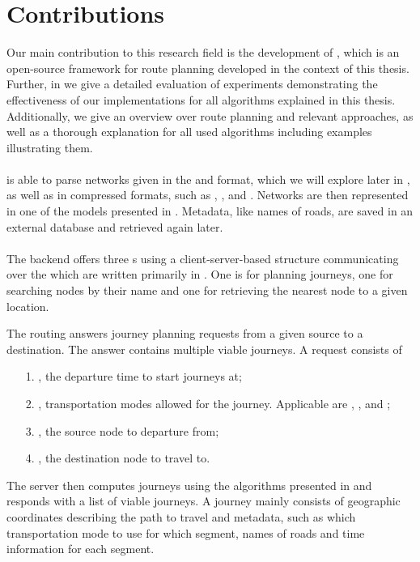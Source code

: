 \section{Contributions}
	Our main contribution to this research field is the development of \cobweb {}, which is an open-source
	framework for \multiModal route planning developed in the context of this thesis. Further, in 
	we give a detailed evaluation of experiments demonstrating the effectiveness of our implementations for all algorithms
	explained in this thesis. Additionally, we give an overview over route planning and relevant approaches, as well as a
	thorough explanation for all used algorithms including examples illustrating them.\\\\
	\cobweb is able to parse networks given in the \osm and \gtfs format, which we will explore later in , as well as
	in compressed formats, such as \bzipTwo {}, \gzip {}, \zip {} and \xz {}.
	Networks are then represented in one of the models presented in . Metadata, like names of roads, are saved in an external
	database and retrieved again later.\\\\
	The backend offers three {\restApi}s  using a client-server-based structure communicating over the \http {} which
	are written primarily in \java.
	One \api is for planning journeys, one for searching nodes by their name and one for retrieving the nearest node to a given location.
	
	The routing \api answers journey planning requests from a given source to a destination. The answer contains multiple viable journeys.
	A request consists of
	\begin{itemize}
		\item[1.] \depTime, the departure time to start journeys at;
		\item[2.] \modes, transportation modes allowed for the journey. Applicable are \car, \bike, \foot and \tram;
		\item[3.] \fromJ, the source node to departure from;
		\item[4.] \toJ, the destination node to travel to.
	\end{itemize}
	The server then computes journeys using the algorithms presented in  and responds with a list of viable
	journeys. A journey mainly consists of geographic coordinates describing the path to travel and metadata, such as which
	transportation mode to use for which segment, names of roads and time information for each segment.
	
